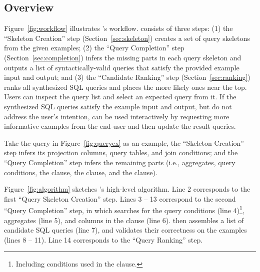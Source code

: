 \subsection{Overview}
\label{sec:algorithm}

\vspace{-1mm}

Figure~\ref{fig:workflow} illustrates \ourtool's workflow.
\ourtool consists of three steps: (1) the ``Skeleton Creation'' step (Section~\ref{sec:skeleton})
creates a set of query skeletons from the given examples;
(2) the ``Query Completion'' step (Section~\ref{sec:completion}) 
infers the missing parts in each query skeleton and outputs
a list of syntactically-valid queries that satisfy
the provided example input and output; and (3) the ``Candidate Ranking'' step (Section~\ref{sec:ranking})
ranks all synthesized SQL queries and places the more likely ones near the top. 
Users can inspect the query list and select an expected query
from it.
If the synthesized SQL queries satisfy the example input and
output, but do not address the user's intention,
\ourtool can be used interactively by requesting more
informative examples from the end-user and then
update the result queries.

Take the query in Figure~\ref{fig:queryex} as an example,
the ``Skeleton Creation''
step infers its projection columns, query tables, and join conditions; and
the ``Query Completion'' step infers the remaining parts (i.e., aggregates,
query conditions, the  clause, the
 clause, and the  clause).

Figure~\ref{fig:algorithm} sketches \ourtool's high-level algorithm.
Line 2 corresponds to the first ``Query Skeleton
Creation'' step. Lines 3 -- 13 correspond to the second ``Query Completion''
step, in which \ourtool searches for the query conditions (line 4)\footnote{
Including conditions used in the  clause.},
aggregates (line 5), and columns in the  clause (line 6).
\ourtool then assembles a list of candidate SQL queries (line 7), and
validates their correctness on the examples (lines 8 -- 11).
Line 14 corresponds to the ``Query Ranking'' step.


